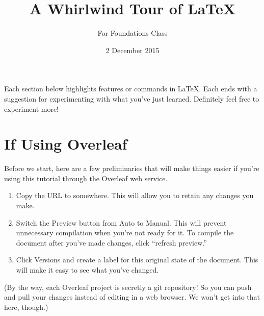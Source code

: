 \documentclass{article}
\title{A Whirlwind Tour of \LaTeX}
\author{For Foundations Class}
\date{2 December 2015}
\begin{document}

\maketitle


Each section below highlights features or commands in \LaTeX.
Each ends with a suggestion for experimenting with what you've just learned.
Definitely feel free to experiment more!


\section{If Using Overleaf} %
\label{sec:overleaf}        %

Before we start, here are a few preliminaries that will make things easier if you're using this tutorial through the Overleaf web service.

\begin{enumerate}
    \item Copy the URL to somewhere.  This will allow you to retain any changes you make.
    \item Switch the Preview button from Auto to Manual.  This will prevent unnecessary compilation when you're not ready for it.  To compile the document after you've made changes, click ``refresh preview.''
    \item Click Versions and create a label for this original state of the document.  This will make it easy to see what you've changed.
\end{enumerate}

(By the way, each Overleaf project is secretly a git repository!
So you can push and pull your changes instead of editing in a web browser.
We won't get into that here, though.)
\end{document}

